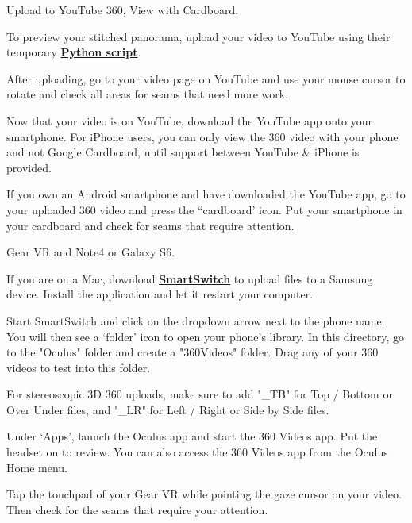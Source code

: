 \begin{fullwidth}
\clearpage
{\large Upload to YouTube 360, View with Cardboard. \par}

To preview your stitched panorama, upload your video to YouTube using their temporary \textbf{\href{https://www.youtube.com/watch?v=Z8VlD2rtACA}{Python script}}.

After uploading, go to your video page on YouTube and use your mouse cursor to rotate and check all areas for seams that need more work.

Now that your video is on YouTube, download the YouTube app onto your smartphone. For iPhone users, you can only view the 360 video with your phone and not Google Cardboard, until support between YouTube & iPhone is provided.

If you own an Android smartphone and have downloaded the YouTube app, go to your uploaded 360 video and press the “cardboard’ icon. Put your smartphone in your cardboard and check for seams that require attention.

{\large Gear VR and Note4 or Galaxy S6. \par}

If you are on a Mac, download \textbf{\href{https://www.dropbox.com/sh/8kqte3wtyt3vltu/AAAjUnNxtXhaxprWF8_q9zbCa?dl=0}{SmartSwitch}} to upload files to a Samsung device. Install the application and let it restart your computer.

Start SmartSwitch and click on the dropdown arrow next to the phone name. You will then see a ‘folder’ icon to open your phone's library. In this directory, go to the "Oculus" folder and create a "360Videos" folder. Drag any of your 360 videos to test into this folder.

\tip For stereoscopic 3D 360 uploads, make sure to add "\_TB" for Top / Bottom or Over Under files, and "\_LR" for Left / Right or Side by Side files.


\clearpage

Under ‘Apps’, launch the Oculus app and start the 360 Videos app. Put the headset on to review. You can also access the 360 Videos app from the Oculus Home menu.


Tap the touchpad of your Gear VR while pointing the gaze cursor on your video. Then check for the seams that require your attention.

\clearpage
\end{fullwidth}